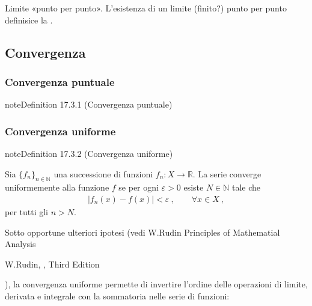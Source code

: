 \documentclass[letterpaper,10pt,italian]{jupyterBook}
\begin{document}
\sphinxAtStartPar
{} Limite «punto per punto». L’esistenza di un limite (finito?) punto per punto definisice la {\hyperref[\detokenize{ch/series:math-hs-series-fun-sequences-convergence-point}]{}}.


\subsection{Convergenza}
\label{\detokenize{ch/series:convergenza}}\label{\detokenize{ch/series:math-hs-series-fun-sequences-convergence}}

\subsubsection{Convergenza puntuale}
\label{\detokenize{ch/series:convergenza-puntuale}}\label{\detokenize{ch/series:math-hs-series-fun-sequences-convergence-point}}\label{ch/series:definition-0}
\begin{sphinxadmonition}{note}{Definition 17.3.1 (Convergenza puntuale)}


\end{sphinxadmonition}


\subsubsection{Convergenza uniforme}
\label{\detokenize{ch/series:convergenza-uniforme}}\label{\detokenize{ch/series:math-hs-series-fun-sequences-convergence-uniform}}\label{ch/series:definition-1}
\begin{sphinxadmonition}{note}{Definition 17.3.2 (Convergenza uniforme)}



\sphinxAtStartPar
Sia \(\{ f_n \}_{n \in \mathbb{N}}\) una successione di funzioni \(f_n:  X \rightarrow \mathbb{R}\). La serie converge uniformemente alla funzione \(f\) se per ogni \(\varepsilon > 0\) esiste \(N \in \mathbb{N}\) tale che
\begin{equation*}
\begin{split}|f_n(x) - f(x)| < \varepsilon \ , \qquad \forall x \in X \ ,\end{split}
\end{equation*}
\sphinxAtStartPar
per tutti gli \(n > N\).
\end{sphinxadmonition}

\sphinxAtStartPar
{} Sotto opportune ulteriori ipotesi (vedi W.Rudin Principles of Mathematial Analysis%
\begin{footnote}[1]\sphinxAtStartFootnote
W.Rudin, , Third Edition
%
\end{footnote}), la convergenza uniforme permette di invertire l’ordine delle operazioni di limite, derivata e integrale con la sommatoria nelle serie di funzioni:
\end{document}
